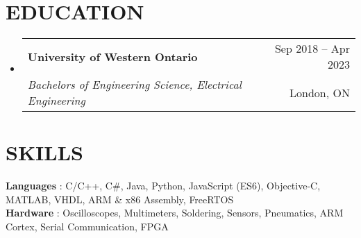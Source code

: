 \documentclass[letterpaper,11pt]{article}
\makeatletter
\newcommand{\resumeItem}[1]{
  \item\small{
    {#1 \vspace{-1pt}}
  }
}
\newcommand{\resumeSubheading}[4]{
  \vspace{-1pt}\item
    \begin{tabular*}{\textwidth}[t]{l@{\extracolsep{\fill}}r}
      \textbf{#1} & {\color{dark-grey}\small #2}\vspace{1pt}\\ %
      \textit{#3} & {\color{dark-grey} \small #4}\\ %
    \end{tabular*}\vspace{-4pt}
}
\newcommand{\resumeSubHeadingListStart}{\begin{itemize}[leftmargin=0in, label={}]}
\newcommand{\resumeSubHeadingListEnd}{\end{itemize}}
\newcommand{\resumeItemListStart}{\begin{itemize}}
\newcommand{\resumeItemListEnd}{\end{itemize}\vspace{0pt}}
\makeatother
\begin{document}
\section {EDUCATION}
  \resumeSubHeadingListStart
    \resumeSubheading
      {University of Western Ontario}{Sep 2018 -- Apr 2023}
      {Bachelors of Engineering Science, Electrical Engineering}{London, ON}
  \resumeSubHeadingListEnd

%
\section{SKILLS}
 \begin{itemize}[leftmargin=0in, label={}]
    \small{\item{
      \textbf{Languages} {: C/C++, C\#, Java, Python, JavaScript (ES6), Objective-C, MATLAB, VHDL, ARM \& x86 Assembly, FreeRTOS}\vspace{2pt} \\
     \textbf{Hardware} {: Oscilloscopes, Multimeters, Soldering, Sensors, Pneumatics, ARM Cortex, Serial Communication, FPGA}
    }}
 \end{itemize}


\end{document}
